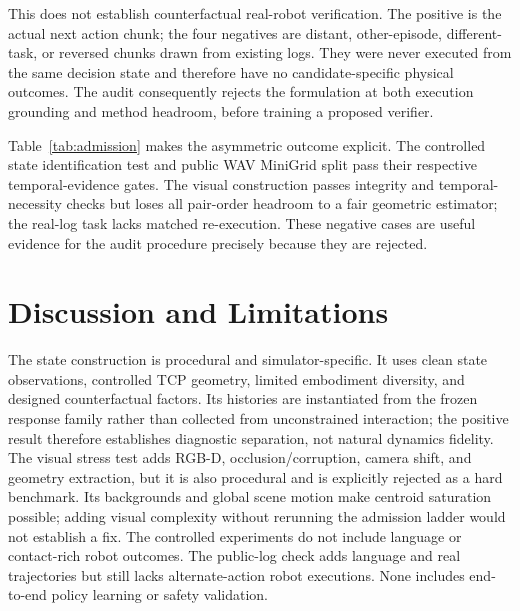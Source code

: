 \documentclass[letterpaper,10pt,conference]{ieeeconf}
\begin{document}
This does not establish counterfactual real-robot verification. The positive
is the actual next action chunk; the four negatives are distant, other-episode,
different-task, or reversed chunks drawn from existing logs. They were never
executed from the same decision state and therefore have no candidate-specific
physical outcomes. The audit consequently rejects the formulation at both
execution grounding and method headroom, before training a proposed verifier.

Table~\ref{tab:admission} makes the asymmetric outcome explicit. The controlled
state identification test and public WAV MiniGrid split pass their respective
temporal-evidence gates. The visual construction passes integrity and temporal-necessity
checks but loses all pair-order headroom to a fair geometric estimator; the
real-log task lacks matched re-execution. These negative cases are useful
evidence for the audit procedure precisely because they are rejected.

\begin{table}[t]
    \centering
    \caption{Benchmark-admission decisions generated from the frozen reports.
    ``Integrity'' covers exact matching, grouped splits, hidden-field
    exclusion, and candidate diversity where applicable. State admission is
    an aggregate claim; one family--mechanism cell is analytically saturated.
    The WAV row covers only its MiniGrid inverse-dynamics split, and the UR5 row
    is logged-continuation identification, not matched re-execution.}
    \label{tab:admission}
    \resizebox{0.94\textwidth}{!}{}
\end{table}

\section{Discussion and Limitations}

The state construction is procedural and simulator-specific. It uses clean
state observations, controlled TCP geometry, limited embodiment diversity,
and designed counterfactual factors. Its histories are instantiated from the
frozen response family rather than collected from unconstrained interaction;
the positive result therefore establishes diagnostic separation, not natural
dynamics fidelity. The visual stress test adds RGB-D,
occlusion/corruption, camera shift, and geometry extraction, but it is also
procedural and is explicitly rejected as a hard benchmark. Its backgrounds
and global scene motion make centroid saturation possible; adding visual
complexity without rerunning the admission ladder would not establish a fix.
The controlled experiments do not include language or contact-rich robot
outcomes. The public-log check adds language and real trajectories but still
lacks alternate-action robot executions. None includes end-to-end policy
learning or safety validation.
\end{document}
